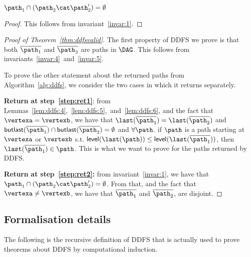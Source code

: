 \begin{mylem}
\label{lem:ddfs:6}
$\patha\cap(\pathb\cat\pathb') = \emptyset$
\end{mylem}
\begin{proof}
This follows from invariant~\ref{invar:1}.
\end{proof}

\begin{proof}[Proof of Theorem~\ref{thm:ddfsvalid}]
The first property of DDFS we prove is that both $\patharet$ and $\pathbret$ are paths in $\DAG$.
This follows from invariants~\ref{invar:4}~and~\ref{invar:5}.

To prove the other statement about the returned paths from Algorithm~\ref{alg:ddfs}, we consider the two cases in which it returns separately.

{\bf Return at step~\ref{step:ret1}}: from Lemmas~\ref{lem:ddfs:4},~\ref{lem:ddfs:5},~and~\ref{lem:ddfs:6}, and the fact that $\vertexa=\vertexb$, we have that
$\last(\patharet) = \last (\pathbret)$ and $\butlast(\patharet) \cap \butlast(\pathbret) = \emptyset$ and $\forall\path.$ if $\path$ is a path starting at $\vertexa$ or $\vertexb$ s.t. $\level(\last(\path)) \leq \level(\last(\patharet))$, then $\last(\patharet)\in\path$.
This is what we want to prove for the paths returned by DDFS.

{\bf Return at step~\ref{step:ret2}:} from invariant~\ref{invar:1}, we have that $\patha\cap(\pathb\cat\pathb')=\emptyset$.
From that, and the fact that $\vertexa\neq\vertexb$, we have that $\patharet$ and $\pathbret$, are disjoint.

\end{proof}

\subsection{Formalisation details}

The following is the recursive definition of DDFS that is actually used to prove theorems about DDFS by computational induction.

